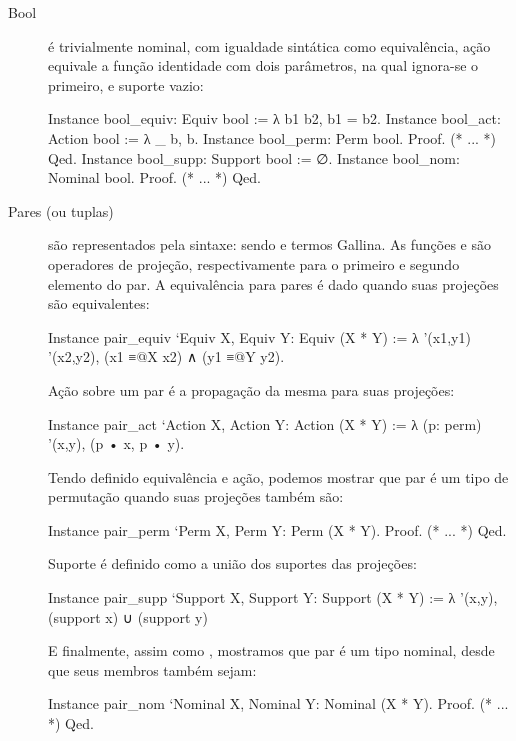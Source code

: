\begin{description}
	\item [Bool] é trivialmente nominal, com igualdade sintática como equivalência, ação equivale a função identidade com dois parâmetros, na qual ignora-se o primeiro, e suporte vazio:
	\begin{coqcode}
Instance bool_equiv: Equiv bool := λ b1 b2, b1 = b2.
Instance bool_act: Action bool := λ _ b, b.
Instance bool_perm: Perm bool. Proof. (* ... *) Qed.
Instance bool_supp: Support bool := ∅.
Instance bool_nom: Nominal bool. Proof. (* ... *) Qed.
	\end{coqcode}
	
	\item[Pares (ou tuplas)] são representados pela sintaxe:  sendo  e  termos Gallina. As funções  e  são operadores de projeção, respectivamente para o primeiro e segundo elemento do par. A equivalência para pares é dado quando suas projeções são equivalentes:
	\begin{coqcode}
Instance pair_equiv `{Equiv X, Equiv Y}: Equiv (X * Y) :=
   λ '(x1,y1) '(x2,y2), (x1 ≡@{X} x2) ∧ (y1 ≡@{Y} y2).
	\end{coqcode}
	Ação sobre um par é a propagação da mesma para suas projeções:
	\begin{coqcode}
Instance pair_act `{Action X, Action Y}: Action (X * Y) :=
   λ (p: perm) '(x,y), (p • x, p • y).
	\end{coqcode}
	Tendo definido equivalência e ação, podemos mostrar que par é um tipo de permutação quando suas projeções também são:
	\begin{coqcode}
Instance pair_perm `{Perm X, Perm Y}: Perm (X * Y).
Proof. (* ... *) Qed.
	\end{coqcode}
	Suporte é definido como a união dos suportes das projeções:
	\begin{coqcode}
Instance pair_supp `{Support X, Support Y}: Support (X * Y) :=
   λ '(x,y), (support x) ∪ (support y)
	\end{coqcode}
	E finalmente, assim como , mostramos que par é um tipo nominal, desde que seus membros também sejam:
	\begin{coqcode}
Instance pair_nom `{Nominal X, Nominal Y}: Nominal (X * Y).
Proof. (* ... *) Qed.	
	\end{coqcode}


\end{description}
